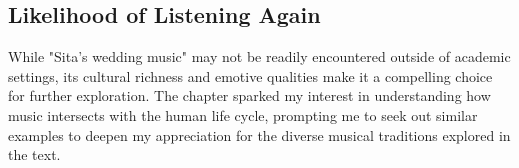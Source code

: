 \subsection{Likelihood of Listening Again}

While "Sita's wedding music" may not be readily encountered outside of academic settings, its cultural richness and emotive qualities make it a compelling choice for further exploration. The chapter sparked my interest in understanding how music intersects with the human life cycle, prompting me to seek out similar examples to deepen my appreciation for the diverse musical traditions explored in the text.